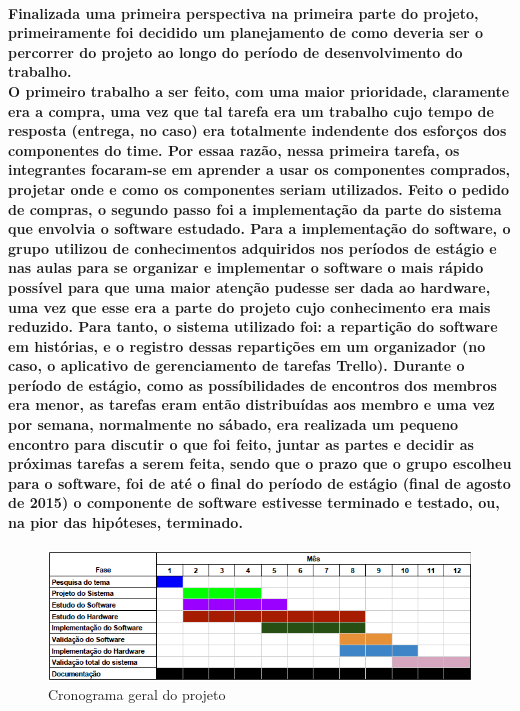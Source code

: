 \label{Métodos de implementação}
\paragraph{
Finalizada uma primeira perspectiva na primeira parte do projeto, primeiramente foi decidido um planejamento de como deveria ser o percorrer do projeto ao longo do período de desenvolvimento do trabalho.\\
O primeiro trabalho a ser feito, com uma maior prioridade, claramente era a compra, uma vez que tal tarefa era um trabalho cujo tempo de resposta (entrega, no caso) era totalmente indendente dos esforços dos componentes do time. Por essaa razão, nessa primeira tarefa, os integrantes focaram-se em aprender a usar os componentes comprados, projetar onde e como os componentes seriam utilizados.
Feito o pedido de compras, o segundo passo foi a implementação da parte do sistema que envolvia o software estudado. Para a implementação do software, o grupo utilizou de conhecimentos adquiridos nos períodos de estágio e nas aulas para se organizar e implementar o software o mais rápido possível para que uma maior atenção pudesse ser dada ao hardware, uma vez que esse era a parte do projeto cujo conhecimento era mais reduzido. Para tanto, o sistema utilizado foi: a repartição do software em histórias, e o registro dessas repartições em um organizador (no caso, o aplicativo de gerenciamento de tarefas Trello). Durante o período de estágio, como as possíbilidades de encontros dos membros era menor, as tarefas eram então distribuídas aos membro e uma vez por semana, normalmente no sábado, era realizada um pequeno encontro para discutir o que foi feito, juntar as partes e decidir as próximas tarefas a serem feita, sendo que o prazo que o grupo escolheu para o software, foi de até o final do período de estágio (final de agosto de 2015) o componente de software estivesse terminado e testado, ou, na pior das hipóteses, terminado.
}

\begin{figure}
\centering
\includegraphics[width=1\textwidth]{figuras/cronogram.png}
\caption{\label{fig:cronogram} Cronograma geral do projeto}
\end{figure}